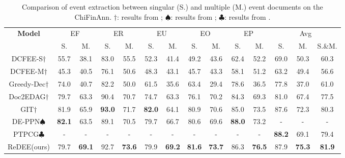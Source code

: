 \documentclass[11pt]{article}
\begin{document}
\begin{table*}
\centering\small
\begin{tabular}{c|cc|cc|cc|cc|cc|ccc}
\hline
\hline
\textbf{Model} & \multicolumn{2}{c|}{EF} & \multicolumn{2}{c|}{ER} & \multicolumn{2}{c|}{EU} & \multicolumn{2}{c|}{EO} & \multicolumn{2}{c|}{EP} & \multicolumn{3}{c}{Avg} \\ 
& S. & M.
& S. & M.
& S. & M.
& S. & M.
& S. & M.
& S. & M. & S.\&M. \\
\hline
DCFEE-S$\dag$ & 55.7 & 38.1 & 83.0 & 55.5 & 52.3 & 41.4 & 49.2 & 43.6 & 62.4 & 52.2 & 69.0 & 50.3 & 60.3 \\
DCFEE-M$\dag$ & 45.3 & 40.5 & 76.1 & 50.6 & 48.3 & 43.1 & 45.7 & 43.3 & 58.1 & 51.2 & 63.2 & 49.4 & 56.6 \\
Greedy-Dec$\dag$ & 74.0 & 40.7 & 82.2 & 50.0 & 61.5 & 35.6 & 63.4 & 29.4 & 78.6 & 36.5 & 77.8 & 37.0 & 61.0 \\
Doc2EDAG$\dag$ & 79.7 & 63.3 & 90.4 & 70.7 & 74.7 & 63.3 & 76.1 & 70.2 & 84.3 & 69.3 & 81.0 & 67.4 & 77.5 \\
GIT$\dag$ & 81.9 & 65.9 & \textbf{93.0} & 71.7 & \textbf{82.0} & 64.1 & 80.9 & 70.6 & 85.0 & 73.5 & 87.6 & 72.3 & 80.3 \\
DE-PPN$\spadesuit$ & \textbf{82.1} & 63.5 & 89.1 & 70.5 & 79.7 & 66.7 & 80.6 & 69.6 & \textbf{88.0} & 73.2 & - & - & - \\
      
PTPCG$\clubsuit$ & - & - & - & - & - & - & - & - & - & - & \textbf{88.2} & 69.1 & 79.4 \\
\hline
ReDEE(ours) & 79.7 & \textbf{69.1} & 92.7 & \textbf{73.6} & 79.9 & \textbf{69.2} & \textbf{81.6} & \textbf{73.7} & 86.3 & \textbf{76.5} & 87.9 & \textbf{75.3} & \textbf{81.9} \\
\hline
\hline
\end{tabular}
\caption{Comparison of event extraction between singular (S.) and multiple (M.) event documents on the ChiFinAnn. $\dag$: results from \cite{GIT}; $\spadesuit$: results from  \cite{DE-PPN}; $\clubsuit$: results from  \cite{PTPCG}.}
\label{tab:multi-event}
\end{table*}

\begin{table}
\centering\small
{}
\caption{Ablation studies on ReDEE variants for RAAT.}
\label{tab:ablation1}
\end{table}
\end{document}
